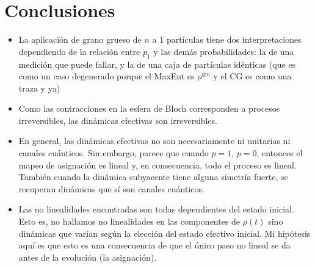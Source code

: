 \chapter{Conclusiones}
\begin{itemize}
    \item La aplicación de grano grueso de $n$ a 1 partículas tiene dos interpretaciones dependiendo de la relación entre $p_{1}$ y las demás probabilidades: la de una medición que puede fallar, y la de una caja de partículas idénticas (que es como un caso degenerado porque el MaxEnt es $\rho^{\otimes n}$ y el CG es como una traza y ya)
    \item Como las contracciones en la esfera de Bloch corresponden a procesos irreversibles, las dinámicas efectivas son irreversibles.
    \item En general, las dinámicas efectivas no son necesariamente ni unitarias ni canales cuánticos. Sin embargo, parece que cuando $p=1$, $p=0$, entonces el mapeo de asignación es lineal y, en consecuencia, todo el proceso es lineal. También cuando la dinámica subyacente tiene alguna simetría fuerte, se recuperan dinámicas que sí son canales cuánticos.
    \item Las no linealidades encontradas son todas dependientes del estado inicial. Esto es, no hallamos no linealidades en las componentes de $\rho(t)$ sino dinámicas que varían según la elección del estado efectivo inicial. Mi hipótesis aquí es que esto es una consecuencia de que el único paso no lineal se da antes de la evolución (la asignación).
\end{itemize}